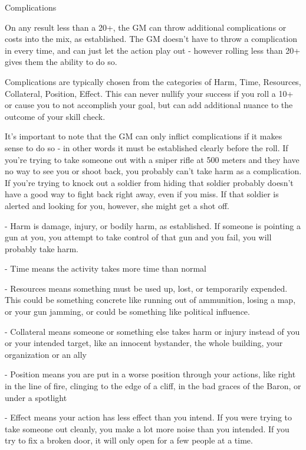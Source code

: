                                                  Complications

On any result less than a 20+, the GM can throw additional complications or costs into the mix,
as established. The GM doesn’t have to throw a complication in every time, and can just let the
action play out - however rolling less than 20+ gives them the ability to do so.


Complications are typically chosen from the categories of Harm, Time, Resources, Collateral,
Position, Effect. This can never nullify your success if you roll a 10+ or cause you to not
accomplish your goal, but can add additional nuance to the outcome of your skill check.


It’s important to note that the GM can only inflict complications if it makes sense to do so - in
other words it must be established clearly before the roll. If you’re trying to take someone out
with a sniper rifle at 500 meters and they have no way to see you or shoot back, you probably
can’t take harm as a complication. If you’re trying to knock out a soldier from hiding that soldier
probably doesn’t have a good way to fight back right away, even if you miss. If that soldier is
alerted and looking for you, however, she might get a shot off.


    -    Harm is damage, injury, or bodily harm, as established. If someone is pointing a gun at
         you, you attempt to take control of that gun and you fail, you will probably take harm.





     -   Time means the activity takes more time than normal

     -   Resources means something must be used up, lost, or temporarily expended. This could
         be something concrete like running out of ammunition, losing a map, or your gun
         jamming, or could be something like political influence.

     -   Collateral means someone or something else takes harm or injury instead of you or your
         intended target, like an innocent bystander, the whole building, your organization or an
         ally

     -   Position means you are put in a worse position through your actions, like right in the line
         of fire, clinging to the edge of a cliff, in the bad graces of the Baron, or under a spotlight

     -   Effect means your action has less effect than you intend. If you were trying to take
         someone out cleanly, you make a lot more noise than you intended. If you try to fix a
         broken door, it will only open for a few people at a time.


